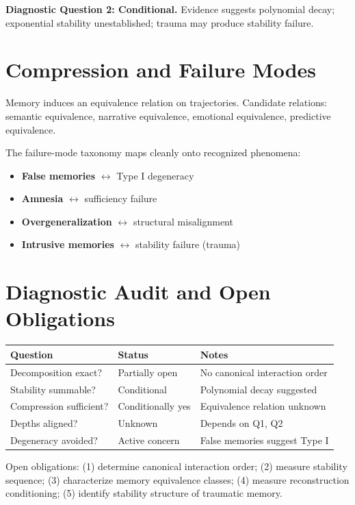\textbf{Diagnostic Question 2: Conditional.} Evidence suggests polynomial decay; exponential stability unestablished; trauma may produce stability failure.

\section{Compression and Failure Modes}

Memory induces an equivalence relation on trajectories. Candidate relations: semantic equivalence, narrative equivalence, emotional equivalence, predictive equivalence.

The failure-mode taxonomy maps cleanly onto recognized phenomena:
\begin{itemize}
  \item \textbf{False memories} $\leftrightarrow$ Type I degeneracy
  \item \textbf{Amnesia} $\leftrightarrow$ sufficiency failure
  \item \textbf{Overgeneralization} $\leftrightarrow$ structural misalignment
  \item \textbf{Intrusive memories} $\leftrightarrow$ stability failure (trauma)
\end{itemize}

\section{Diagnostic Audit and Open Obligations}

\begin{center}\small
\begin{tabular}{lll}
\toprule
Question & Status & Notes \\
\midrule
Decomposition exact? & Partially open & No canonical interaction order \\
Stability summable? & Conditional & Polynomial decay suggested \\
Compression sufficient? & Conditionally yes & Equivalence relation unknown \\
Depths aligned? & Unknown & Depends on Q1, Q2 \\
Degeneracy avoided? & Active concern & False memories suggest Type I \\
\bottomrule
\end{tabular}
\end{center}

Open obligations: (1) determine canonical interaction order; (2) measure stability sequence; (3) characterize memory equivalence classes; (4) measure reconstruction conditioning; (5) identify stability structure of traumatic memory.
